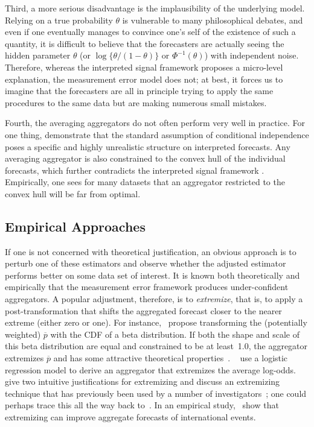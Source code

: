 \documentclass[11pt]{article}
\theoremstyle{definition}
\theoremstyle{definition}
\def\pb{\overline{p}}
\begin{document}
Third, a more serious disadvantage is the implausibility of the
underlying model. Relying on a true probability $\theta$ is vulnerable to
many philosophical debates, and even if one eventually manages to
convince one's self of the existence of such a quantity, it is
difficult to believe that the forecasters are actually seeing the
hidden parameter $\theta$ (or $\log\{\theta/(1-\theta)\}$ or
$\Phi^{-1}(\theta)$) with independent noise. Therefore, whereas the
interpreted signal framework proposes a micro-level explanation, the
measurement error model does not; at best, it forces us to imagine that
the forecasters are all in principle trying to apply the same
procedures to the same data but are making numerous small mistakes.

Fourth, the averaging aggregators do not often perform
very well in practice. For one thing,  \citet{hong2009interpreted} demonstrate that the standard
assumption of conditional independence poses a specific and highly
unrealistic structure on interpreted forecasts. Any averaging aggregator is also constrained to
the convex hull of the individual forecasts, which further contradicts the
interpreted signal framework \citep{parunak2013characterizing}.  Empirically, one sees
for many datasets that an aggregator restricted to the convex hull
will be far from optimal. 

\subsection{Empirical Approaches}
\label{ss:empirical}

If one is not concerned with theoretical justification, an obvious
approach is to perturb one of these estimators and observe whether the
adjusted estimator performs better on some data set of interest.  It
is known both theoretically and empirically that the measurement error
framework produces under-confident aggregators.  A popular adjustment,
therefore, is to {\em extremize}, that is, to apply a
post-transformation that shifts the aggregated forecast closer to the
nearer extreme (either zero or one).  For instance,~\citet{Ranjan08}
propose transforming the (potentially weighted) $\pb$ with the CDF of a
beta distribution.  If both the shape and scale of this beta
distribution are equal and constrained to be at least~1.0, the
aggregator extremizes $\pb$ and has some attractive theoretical
properties~\citep{Wallsten2001}.  ~\citet{satopaa} use a logistic
regression model to derive an aggregator that extremizes the average
log-odds.  ~\citet{baron2014two} give two intuitive justifications for
extremizing and discuss an extremizing technique that has previously
been used by a number of investigators~\citep{Erev1994,
shlomi2010subjective}; one could perhaps trace this all the way back
to~\citet{karmarkar1978subjectively}.  In an empirical
study,~\citet{mellers2014psychological} show that extremizing can
improve aggregate forecasts of international events.
\end{document}
